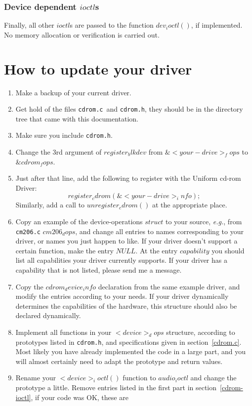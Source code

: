 \documentclass{article}
\newcommand{\newsection}[1]{\newpage\section{#1}}
\def\UCD{{\sc Uniform cd-rom Driver}}
\def\cdromc{{\tt {cdrom.c}}}
\def\cdromh{{\tt {cdrom.h}}}
\def\fo{\sl}                    %
\def\eg{{\fo e.g.}}
\begin{document}
\subsubsection{Device dependent $ioctl$s}

Finally, all other $ioctl$s are passed to the function $dev_ioctl()$,
if implemented. No memory allocation or verification is carried out. 

\newsection{How to update your driver}

\begin{enumerate}
\item Make a backup of your current driver. 
\item Get hold of the files \cdromc\ and \cdromh, they should be in
  the directory tree that came with this documentation.
\item Make sure you include \cdromh.
\item Change the 3rd argument of $register_blkdev$ from
$\&<your-drive>_fops$ to $\&cdrom_fops$. 
\item Just after that line, add the following to register with the \UCD:
  $$register_cdrom(\&<your-drive>_info);$$
  Similarly, add a call to $unregister_cdrom()$ at the appropriate place.
\item Copy an example of the device-operations $struct$ to your
  source, \eg, from {\tt {cm206.c}} $cm206_dops$, and change all
  entries to names corresponding to your driver, or names you just
  happen to like. If your driver doesn't support a certain function,
  make the entry $NULL$. At the entry $capability$ you should list all
  capabilities your driver currently supports. If your driver
  has a capability that is not listed, please send me a message.
\item Copy the $cdrom_device_info$ declaration from the same example
  driver, and modify the entries according to your needs. If your
  driver dynamically determines the capabilities of the hardware, this
  structure should also be declared dynamically. 
\item Implement all functions in your $<device>_dops$ structure,
  according to prototypes listed in \cdromh, and specifications given
  in section~\ref{cdrom.c}. Most likely you have already implemented
  the code in a large part, and you will almost certainly need to adapt the
  prototype and return values.
\item Rename your $<device>_ioctl()$ function to $audio_ioctl$ and
  change the prototype a little. Remove entries listed in the first
  part in section~\ref{cdrom-ioctl}, if your code was OK, these are

\end{enumerate}
\end{document}
